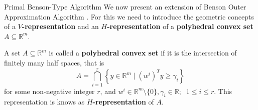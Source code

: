 \documentclass[10pt,xcolor={table,dvipsnames},t,unknownkeysallowed]{beamer}
\newcommand{\R}{\mathbb{R}}
\begin{document}
\begin{frame}{Primal Benson-Type Algorithm}
    We now present an extension of Benson Outer Approximation Algorithm \cite{aEhrgottShaoSch2011}. For this we need to introduce the geometric concepts of a \textbf{\alert{$V$-representation}} and  an \textbf{\alert{$H$-representation}} of a \textbf{\alert{polyhedral convex set}} $A\subseteq\R^m$.
    \begin{definition}
        A set $A\subseteq\R^m$ is called a \textbf{\alert{polyhedral convex set}} if it is the intersection of finitely many half spaces, that is
        \begin{equation}\label{h-rep}
            A=\bigcap_{i=1}^r\left\{y\in \R^m\;|\; (w^i)^Ty\geq \gamma_i\right\}
        \end{equation}
        for some non-negative integer $r$, and $w^i\in\R^m\setminus\{0\}, \gamma_i\in \R ;\;\; 1\leq i\leq r$. This representation is knows as \textbf{\alert{$H$-representation}} of $A$.
    \end{definition}
\end{frame}
\end{document}
